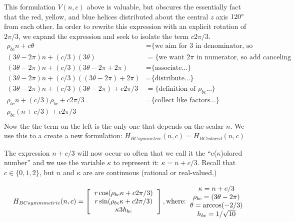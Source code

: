 \documentclass[11pt]{article}
\begin{document}
This formulation $V(n,c)$ above is valuable, but obscures the essentially fact that the red, yellow, and blue helices distributed
about the central $z$ axis $120\degree$ from each other.
In order to rewrite this expression with an explicit rotation of $2\pi/3$, we expand 
the expression and seek to isolate the term $c2\pi/3$.
\begin{align*}
  \rho_{bc} n + c \theta  &=   \text{\{we aim for 3 in denominator, so we split...\}} \\
    (3 \theta - 2 \pi)n + (c/3)  (3 \theta)  &=   \text{\{we want $2\pi$ in numerator, so add canceling terms...\}} \\
  (3 \theta - 2 \pi)n + (c/ 3) (3 \theta - 2 \pi  + 2 \pi) &=  \text{\{associate...\}} \\
  (3 \theta - 2 \pi)n + (c/ 3) ((3 \theta - 2 \pi)  + 2 \pi) &=  \text{\{distribute...\}} \\  
  (3 \theta - 2 \pi)n + (c / 3) (3 \theta - 2 \pi)  + c 2 \pi /3 &=  \text{\{definition of $\rho_{bc}$...\}} \\
  \rho_{bc} n + (c / 3) \rho_{bc}  + c 2 \pi /3 &=  \text{\{collect like factors...\}} \\  
  \rho_{bc} (n + c/3)  + c 2 \pi /3  \\
\end{align*}
Now the the term on the left is the only one that depends on the scalar $n$. We use this to a create
a new formulation: $H_{BCsymmetric}(n,c) = H_{BCcolored}(n,c)$

The expression $n+c/3$ will now occur so often that we call it the ``c($\kappa$)olored number'' and we use the variable $\kappa$ to represent it: $\kappa = n+c/3$.
Recall that $c \in \{0,1,2\}$, but $n$ and $\kappa$ are are continuous (rational or real-valued.)

\begin{equation}
H_{BCsymmmetric}(n,c) =
\left [
  \begin{tabular}{c}
   $ r  \cos(\rho_{bc} \kappa  + c 2 \pi /3) $\\
   $ r  \sin(\rho_{bc} \kappa  + c 2 \pi /3) $\\
   $ \kappa 3  h_{bc} $
  \end{tabular}
  \right ],
\text{where:}
  \begin{tabular}{c}
 $\kappa = n + c/3$ \\
    $\rho_{bc} = (3 \theta - 2 \pi)$ \\
    $ \theta = \arccos(-2/3) $ \\
    $ h_{bc} = 1/\sqrt{10} $ \\    
  \end{tabular}      
\end{equation}
\end{document}
